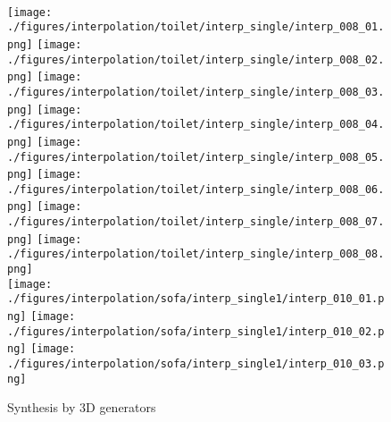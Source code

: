 \documentclass[10pt,twocolumn,letterpaper]{article}
\begin{document}
\begin{figure*}
\begin{minipage}[b]{.34\textwidth}
  \caption{Synthesis by 3D generators}
  \label{fig:synthesis_generator}
\end{minipage}%
~
\begin{minipage}[b]{.64\textwidth}
  \centering
  	\texttt{[image: ./figures/interpolation/toilet/interp\_single/interp\_008\_01.png]}\hspace{-3.5mm} 
	\texttt{[image: ./figures/interpolation/toilet/interp\_single/interp\_008\_02.png]}\hspace{-3.5mm} 
	\texttt{[image: ./figures/interpolation/toilet/interp\_single/interp\_008\_03.png]}\hspace{-3.5mm} 
    \texttt{[image: ./figures/interpolation/toilet/interp\_single/interp\_008\_04.png]}\hspace{-3.5mm} 
    \texttt{[image: ./figures/interpolation/toilet/interp\_single/interp\_008\_05.png]}\hspace{-3.5mm} 
    \texttt{[image: ./figures/interpolation/toilet/interp\_single/interp\_008\_06.png]}\hspace{-3.5mm} 
    \texttt{[image: ./figures/interpolation/toilet/interp\_single/interp\_008\_07.png]}\hspace{-3.5mm} 
    \texttt{[image: ./figures/interpolation/toilet/interp\_single/interp\_008\_08.png]}\\
    	\texttt{[image: ./figures/interpolation/sofa/interp\_single1/interp\_010\_01.png]} \hspace{-1.7mm} 
	\texttt{[image: ./figures/interpolation/sofa/interp\_single1/interp\_010\_02.png]} \hspace{-1.7mm}  
	\texttt{[image: ./figures/interpolation/sofa/interp\_single1/interp\_010\_03.png]} \hspace{-1.7mm} 

\end{minipage}
\end{figure*}
\end{document}
